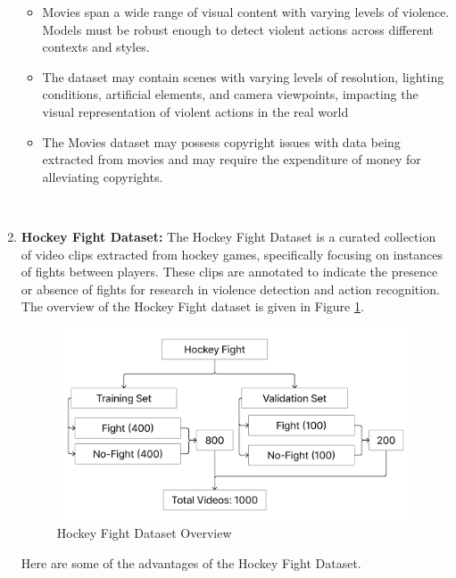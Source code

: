 \begin{enumerate}
    \begin{itemize}
        \item Movies span a wide range of visual content with varying levels of violence. Models must be robust enough to detect violent actions across different contexts and styles.
        \item The dataset may contain scenes with varying levels of resolution, lighting conditions, artificial elements, and camera viewpoints, impacting the visual representation of violent actions in the real world
        \item The Movies dataset may possess copyright issues with data being extracted from movies and may require the expenditure of money for alleviating copyrights.
    \end{itemize}\

    \item \textbf{Hockey Fight Dataset:}
    The Hockey Fight Dataset is a curated collection of video clips extracted from hockey games, specifically focusing on instances of fights between players\cite{hockey}. These clips are annotated to indicate the presence or absence of fights for research in violence detection and action recognition. The overview of the Hockey Fight dataset is given in Figure \ref{hockeyfight}.\\
    
    \begin{figure}[h]
        \centering
         \includegraphics[width=0.9\linewidth]{Images/Hockey fight.png}
        \caption{Hockey Fight Dataset Overview}
        \label{hockeyfight}
    \end{figure}
    Here are some of the advantages of the Hockey Fight Dataset.



\end{enumerate}
